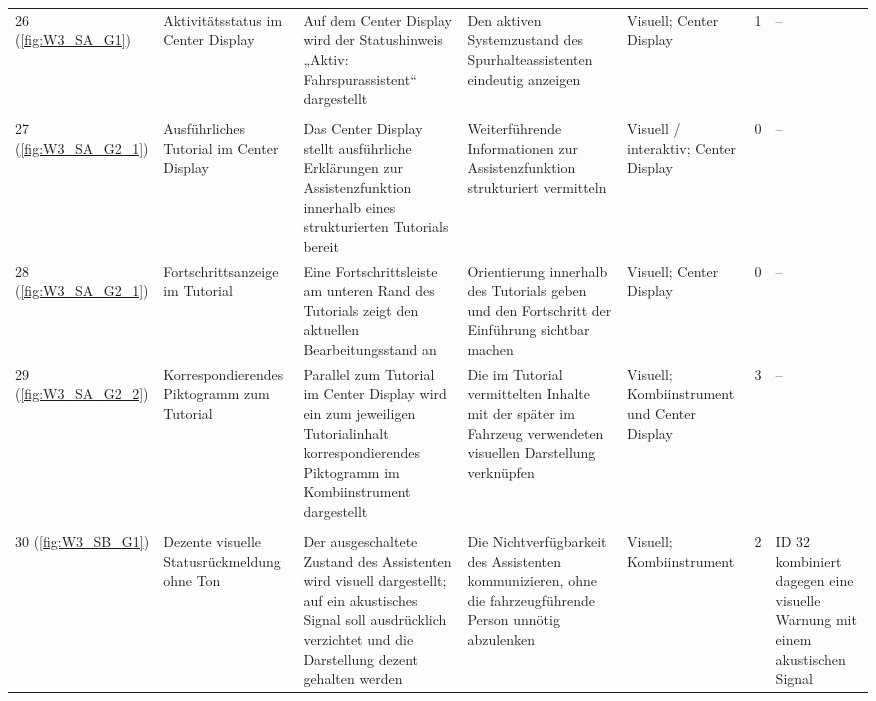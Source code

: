 {\begin{xltabular}{\textwidth}{
    P{0.65cm}
    Y
    Y
    Y
    P{1.75cm}
    P{1.25cm}
    Y
}
\rowrule

26 (\ref{fig:W3_SA_G1}) &
Aktivitätsstatus im Center Display &
Auf dem Center Display wird der Statushinweis „Aktiv: Fahrspurassistent“ dargestellt &
Den aktiven Systemzustand des Spurhalteassistenten eindeutig anzeigen &
Visuell; Center Display &
1 &
--
\\

\rowrule
{}
\\
\rowrule

27 (\ref{fig:W3_SA_G2_1}) &
Ausführliches Tutorial im Center Display &
Das Center Display stellt ausführliche Erklärungen zur Assistenzfunktion innerhalb eines strukturierten Tutorials bereit &
Weiterführende Informationen zur Assistenzfunktion strukturiert vermitteln &
Visuell / interaktiv; Center Display &
0 &
--
\\

\rowrule

28 (\ref{fig:W3_SA_G2_1}) &
Fortschrittsanzeige im Tutorial &
Eine Fortschrittsleiste am unteren Rand des Tutorials zeigt den aktuellen Bearbeitungsstand an &
Orientierung innerhalb des Tutorials geben und den Fortschritt der Einführung sichtbar machen &
Visuell; Center Display &
0 &
--
\\

\rowrule

29 (\ref{fig:W3_SA_G2_2}) &
Korrespondierendes Piktogramm zum Tutorial &
Parallel zum Tutorial im Center Display wird ein zum jeweiligen Tutorialinhalt korrespondierendes Piktogramm im Kombiinstrument dargestellt &
Die im Tutorial vermittelten Inhalte mit der später im Fahrzeug verwendeten visuellen Darstellung verknüpfen &
Visuell; Kombiinstrument und Center Display &
3 &
--
\\

\rowrule
{}
\\
\rowrule

30 (\ref{fig:W3_SB_G1}) &
Dezente visuelle Statusrückmeldung ohne Ton &
Der ausgeschaltete Zustand des Assistenten wird visuell dargestellt; auf ein akustisches Signal soll ausdrücklich verzichtet und die Darstellung dezent gehalten werden &
Die Nichtverfügbarkeit des Assistenten kommunizieren, ohne die fahrzeugführende Person unnötig abzulenken &
Visuell; Kombiinstrument &
2 &
ID 32 kombiniert dagegen eine visuelle Warnung mit einem akustischen Signal
\\


\end{xltabular}}
